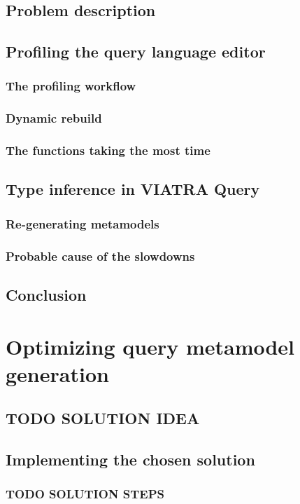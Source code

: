 \documentclass[11pt,a4paper,oneside]{report}
\begin{document}
\section{Problem description}
\section{Profiling the query language editor}
\subsection{The profiling workflow}
\subsection{Dynamic rebuild}
\subsection{The functions taking the most time}
\section{Type inference in VIATRA Query}
\subsection{Re-generating metamodels}
\subsection{Probable cause of the slowdowns}
\section{Conclusion}

\chapter{Optimizing query metamodel generation}
\section{TODO SOLUTION IDEA}
\section{Implementing the chosen solution}
\subsection{TODO SOLUTION STEPS}
\end{document}
